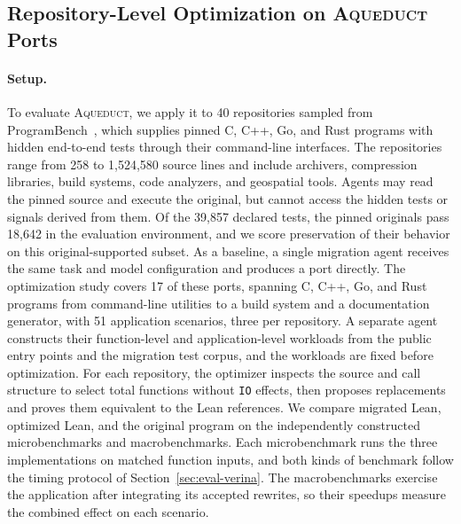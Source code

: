\documentclass{article}
\newcommand{\aqueduct}{\textsc{Aqueduct}\xspace}
\begin{document}
\subsection{Repository-Level Optimization on \aqueduct{} Ports}
\label{sec:eval-aqueduct}
\label{sec:eval-results}

\paragraph{Setup.}
To evaluate \aqueduct{}, we apply it to 40 repositories sampled from ProgramBench~\citep{yang2026programbench}, which supplies pinned C, C++, Go, and Rust programs with hidden end-to-end tests through their command-line interfaces.
The repositories range from 258 to 1,524,580 source lines and include archivers, compression libraries, build systems, code analyzers, and geospatial tools.
Agents may read the pinned source and execute the original, but cannot access the hidden tests or signals derived from them.
Of the 39,857 declared tests, the pinned originals pass 18,642 in the evaluation environment, and we score preservation of their behavior on this original-supported subset.
As a baseline, a single migration agent receives the same task and model configuration and produces a port directly.
The optimization study covers 17 of these ports, spanning C, C++, Go, and Rust programs from command-line utilities to a build system and a documentation generator, with 51 application scenarios, three per repository.
A separate agent constructs their function-level and application-level workloads from the public entry points and the migration test corpus, and the workloads are fixed before optimization.
For each repository, the optimizer inspects the source and call structure to select total functions without \texttt{IO} effects, then proposes replacements and proves them equivalent to the Lean references.
We compare migrated Lean, optimized Lean, and the original program on the independently constructed microbenchmarks and macrobenchmarks.
Each microbenchmark runs the three implementations on matched function inputs, and both kinds of benchmark follow the timing protocol of Section~\ref{sec:eval-verina}.
The macrobenchmarks exercise the application after integrating its accepted rewrites, so their speedups measure the combined effect on each scenario.
\end{document}
